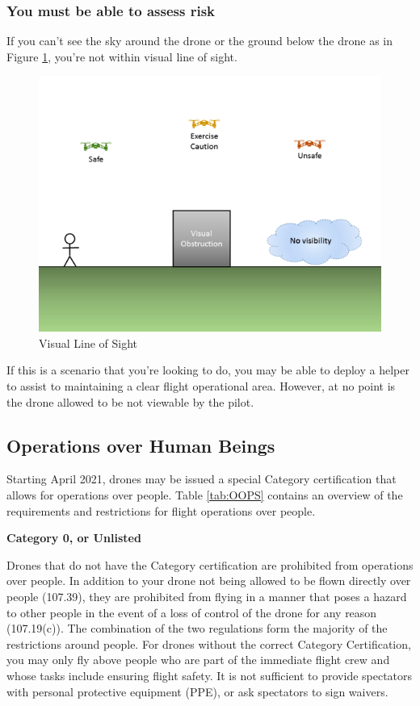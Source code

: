 \documentclass[
  12pt,
]{book}
\begin{document}
\hypertarget{you-must-be-able-to-assess-risk}{%
\subsubsection{You must be able to assess risk}\label{you-must-be-able-to-assess-risk}}

If you can't see the sky around the drone or the ground below the drone as in Figure \ref{fig:vlos}, you're not within visual line of sight.

\begin{figure}

{\centering \includegraphics[width=0.8\linewidth]{images/VLOS_G} 

}

\caption{Visual Line of Sight}\label{fig:vlos}
\end{figure}

If this is a scenario that you're looking to do, you may be able to deploy a helper to assist to maintaining a clear flight operational area. However, at no point is the drone allowed to be not viewable by the pilot.

\hypertarget{operations-over-human-beings}{%
\subsection{Operations over Human Beings}\label{operations-over-human-beings}}

Starting April 2021, drones may be issued a special Category certification that allows for operations over people. Table \ref{tab:OOPS} contains an overview of the requirements and restrictions for flight operations over people.

\textbf{Category 0, or Unlisted}

Drones that do not have the Category certification are prohibited from operations over people. In addition to your drone not being allowed to be flown directly over people (107.39), they are prohibited from flying in a manner that poses a hazard to other people in the event of a loss of control of the drone for any reason (107.19(c)). The combination of the two regulations form the majority of the restrictions around people. For drones without the correct Category Certification, you may only fly above people who are part of the immediate flight crew and whose tasks include ensuring flight safety. It is not sufficient to provide spectators with personal protective equipment (PPE), or ask spectators to sign waivers.
\end{document}
